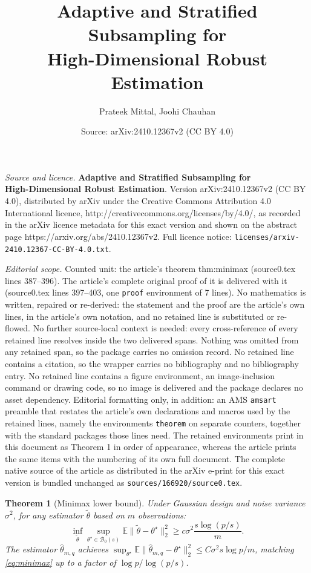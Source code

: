 \documentclass[10pt,a4paper]{amsart}
\title{\textbf{Adaptive and Stratified Subsampling for\\ High-Dimensional Robust Estimation}}
\author{Prateek Mittal, Joohi Chauhan}
\date{Source: arXiv:2410.12367v2 (CC BY 4.0)}
\newtheorem{theorem}{Theorem}
\newcommand{\E}{\mathbb{E}}
\newcommand{\hth}{\hat{\theta}}
\newcommand{\ts}{\theta^{\star}}
\begin{document}
\maketitle

\noindent\emph{Source and licence.} \textbf{Adaptive and Stratified Subsampling for\\ High-Dimensional Robust Estimation}. Version arXiv:2410.12367v2 (CC BY 4.0), distributed by arXiv under the Creative Commons Attribution 4.0 International licence, http://creativecommons.org/licenses/by/4.0/, as recorded in the arXiv licence metadata for this exact version and shown on the abstract page https://arxiv.org/abs/2410.12367v2. Full licence notice: \texttt{licenses/arxiv-2410.12367-CC-BY-4.0.txt}.\par\smallskip

\noindent\textit{Editorial scope.} Counted unit: the article's theorem thm:minimax (source0.tex lines 387--396). The article's complete original proof of it is delivered with it (source0.tex lines 397--403, one \texttt{proof} environment of 7 lines). No mathematics is written, repaired or re-derived: the statement and the proof are the article's own lines, in the article's own notation, and no retained line is substituted or re-flowed.  No further source-local context is needed: every cross-reference of every retained line resolves inside the two delivered spans.  Nothing was omitted from any retained span, so the package carries no omission record.  No retained line contains a citation, so the wrapper carries no bibliography and no bibliography entry.  No retained line contains a figure environment, an image-inclusion command or drawing code, so no image is delivered and the package declares no asset dependency.  Editorial formatting only, in addition: an AMS \texttt{amsart} preamble that restates the article's own declarations and macros used by the retained lines, namely the environments \texttt{theorem} on separate counters, together with the standard packages those lines need.  The retained environments print in this document as Theorem 1 in order of appearance, whereas the article prints the same items with the numbering of its own full document.  The complete native source of the article as distributed in the arXiv e-print for this exact version is bundled unchanged as \texttt{sources/166920/source0.tex}.
\begin{theorem}[Minimax lower bound]\label{thm:minimax}
Under Gaussian design and noise variance $\sigma^2$, for any estimator $\tilde\theta$ based on $m$
observations:
\begin{equation}\label{eq:minimax}
  \inf_{\tilde\theta}\sup_{\ts\in\mathcal{B}_0(s)}
  \E\|\tilde\theta-\ts\|_2^2\ge c\sigma^2\frac{s\log(p/s)}{m}.
\end{equation}
The estimator $\hth_{m,q}$ achieves $\sup_{\ts}\E\|\hth_{m,q}-\ts\|_2^2\le
C\sigma^2s\log p/m$, matching \eqref{eq:minimax} up to a factor of $\log p/\log(p/s)$.
\end{theorem}
\end{document}
